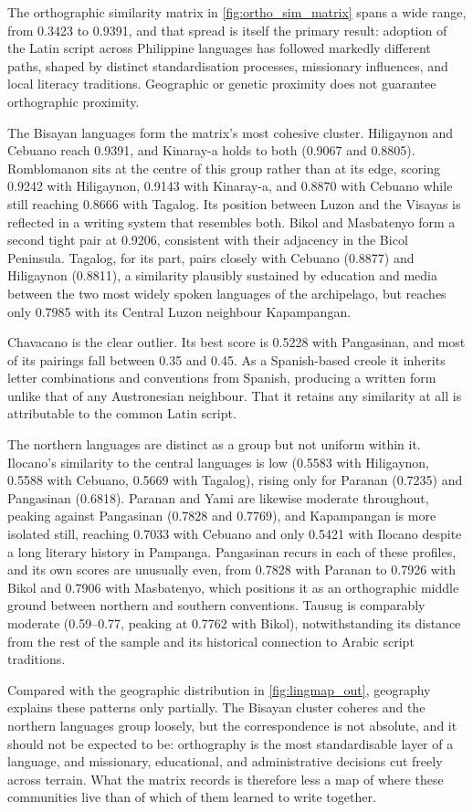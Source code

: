 The orthographic similarity matrix in \cref{fig:ortho_sim_matrix} spans a wide
range, from 0.3423 to 0.9391, and that spread is itself the primary result:
adoption of the Latin script across Philippine languages has followed markedly
different paths, shaped by distinct standardisation processes, missionary
influences, and local literacy traditions. Geographic or genetic proximity does
not guarantee orthographic proximity.

The Bisayan languages form the matrix's most cohesive cluster. Hiligaynon and
Cebuano reach 0.9391, and Kinaray-a holds to both (0.9067 and 0.8805).
Romblomanon sits at the centre of this group rather than at its edge, scoring
0.9242 with Hiligaynon, 0.9143 with Kinaray-a, and 0.8870 with Cebuano while
still reaching 0.8666 with Tagalog. Its position between Luzon and the Visayas
is reflected in a writing system that resembles both. Bikol and Masbatenyo form
a second tight pair at 0.9206, consistent with their adjacency in the Bicol
Peninsula. Tagalog, for its part, pairs closely with Cebuano (0.8877) and
Hiligaynon (0.8811), a similarity plausibly sustained by education and media
between the two most widely spoken languages of the archipelago, but reaches
only 0.7985 with its Central Luzon neighbour Kapampangan.

Chavacano is the clear outlier. Its best score is 0.5228 with Pangasinan, and
most of its pairings fall between 0.35 and 0.45. As a Spanish-based creole it
inherits letter combinations and conventions from Spanish, producing a written
form unlike that of any Austronesian neighbour. That it retains any similarity
at all is attributable to the common Latin script.

The northern languages are distinct as a group but not uniform within it.
Ilocano's similarity to the central languages is low (0.5583 with Hiligaynon,
0.5588 with Cebuano, 0.5669 with Tagalog), rising only for Paranan (0.7235) and
Pangasinan (0.6818). Paranan and Yami are likewise moderate throughout, peaking
against Pangasinan (0.7828 and 0.7769), and Kapampangan is more isolated still,
reaching 0.7033 with Cebuano and only 0.5421 with Ilocano despite a long
literary history in Pampanga. Pangasinan recurs in each of these profiles, and
its own scores are unusually even, from 0.7828 with Paranan to 0.7926 with Bikol
and 0.7906 with Masbatenyo, which positions it as an orthographic middle ground
between northern and southern conventions. Tausug is comparably moderate
(0.59--0.77, peaking at 0.7762 with Bikol), notwithstanding its distance from
the rest of the sample and its historical connection to Arabic script
traditions.

Compared with the geographic distribution in \cref{fig:lingmap_out}, geography
explains these patterns only partially. The Bisayan cluster coheres and the
northern languages group loosely, but the correspondence is not absolute, and it
should not be expected to be: orthography is the most standardisable layer of a
language, and missionary, educational, and administrative decisions cut freely
across terrain. What the matrix records is therefore less a map of where these
communities live than of which of them learned to write together.